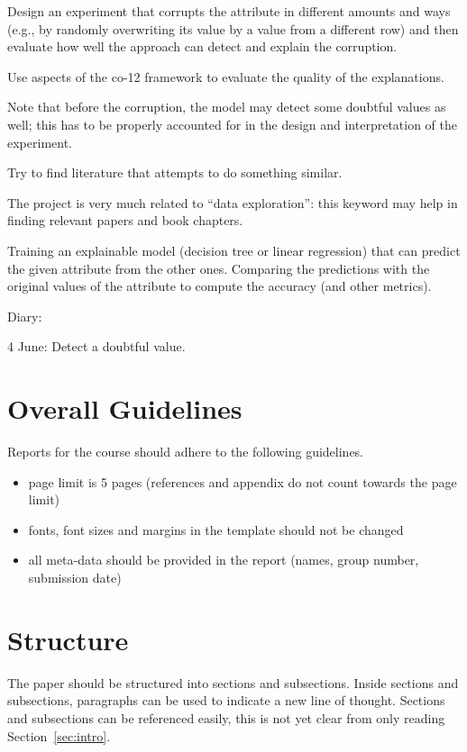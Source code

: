 \documentclass[sigconf]{acmart}
\begin{document}
Design an experiment that corrupts the attribute in different amounts and ways (e.g., by randomly overwriting its value by a value from a different row) and then evaluate how well the approach can detect and explain the corruption. 

Use aspects of the co-12 framework to evaluate the quality of the explanations.

Note that before the corruption, the model may detect some doubtful values as well; this has to be properly accounted for in the design and interpretation of the experiment.

Try to find literature that attempts to do something similar. 

The project is very much related to “data exploration”: this keyword may help in finding relevant papers and book chapters.



Training an explainable model (decision tree or linear regression) that can predict the given attribute from the other ones.
Comparing the predictions with the original values of the attribute to compute the accuracy (and other metrics).


Diary: 

4 June: Detect a doubtful value. 


\section{Overall Guidelines}
Reports for the course should adhere to the following guidelines.
\begin{itemize}
	\item page limit is 5 pages (references and appendix do not count towards the page limit)
	\item fonts, font sizes and margins in the template should not be changed
	\item all meta-data should be provided in the report (names, group number, submission date)
\end{itemize}

\section{Structure}
The paper should be structured into sections and subsections. Inside sections and subsections, paragraphs can be used to indicate a new line of thought. Sections and subsections can be referenced easily, this is not yet clear from only reading Section~\ref{sec:intro}.
\end{document}
